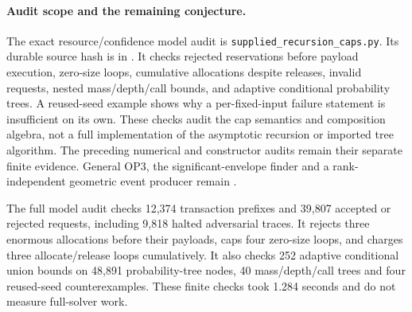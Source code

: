 \paragraph{Audit scope and the remaining conjecture.}
The exact resource/confidence model audit is
\texttt{supplied\_recursion\_caps.py}. Its durable source hash is in
. It checks rejected
reservations before payload execution, zero-size loops, cumulative
allocations despite releases, invalid requests, nested mass/depth/call
bounds, and adaptive conditional probability trees. A reused-seed example
shows why a per-fixed-input failure statement is insufficient on its own.
These checks audit the cap semantics and composition algebra, not a full
implementation of the asymptotic recursion or imported tree algorithm.
The preceding numerical and constructor audits remain their separate
finite evidence. General OP3, the significant-envelope finder and a
rank-independent geometric event producer remain \statusopen.

The full model audit checks 12,374 transaction prefixes and 39,807 accepted
or rejected requests, including 9,818 halted adversarial traces. It rejects
three enormous allocations before their payloads, caps four zero-size
loops, and charges three allocate/release loops cumulatively. It also
checks 252 adaptive conditional union bounds on 48,891 probability-tree
nodes, 40 mass/depth/call trees and four reused-seed counterexamples.
These finite checks took 1.284 seconds and do not measure full-solver work.
